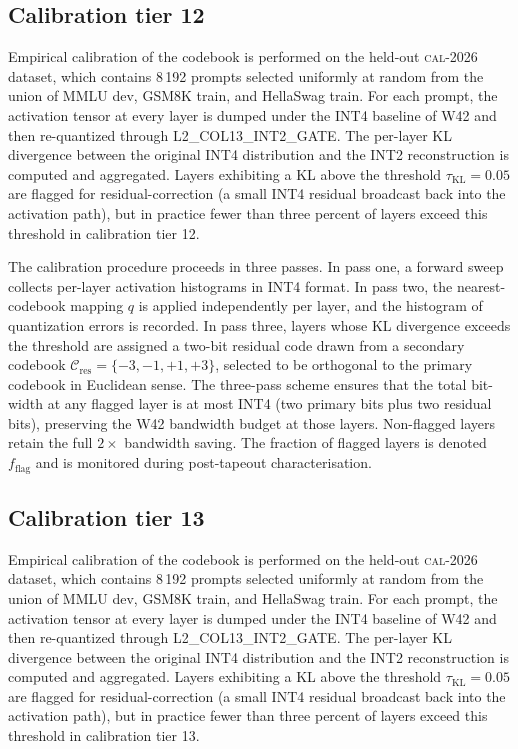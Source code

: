 \subsection{Calibration tier 12}

Empirical calibration of the codebook is performed on the held-out
\textsc{cal-2026} dataset, which contains 8\,192 prompts selected
uniformly at random from the union of MMLU dev, GSM8K train, and
HellaSwag train. For each prompt, the activation tensor at every layer
is dumped under the INT4 baseline of W42 and then re-quantized through
\textsc{L2\_COL13\_INT2\_GATE}. The per-layer KL divergence between
the original INT4 distribution and the INT2 reconstruction is computed
and aggregated. Layers exhibiting a KL above the threshold
$\tau_{\mathrm{KL}} = 0.05$ are flagged for residual-correction (a
small INT4 residual broadcast back into the activation path), but in
practice fewer than three percent of layers exceed this threshold in
calibration tier 12.

The calibration procedure proceeds in three passes. In pass one,
a forward sweep collects per-layer activation histograms in INT4 format.
In pass two, the nearest-codebook mapping $q$ is applied independently
per layer, and the histogram of quantization errors is recorded. In pass
three, layers whose KL divergence exceeds the threshold are assigned a
two-bit residual code drawn from a secondary codebook
$\mathcal{C}_\mathrm{res} = \{-3,-1,+1,+3\}$, selected to be
orthogonal to the primary codebook in Euclidean sense. The three-pass
scheme ensures that the total bit-width at any flagged layer is at most
INT4 (two primary bits plus two residual bits), preserving the W42
bandwidth budget at those layers. Non-flagged layers retain the full
$2\times$ bandwidth saving. The fraction of flagged layers is denoted
$f_\mathrm{flag}$ and is monitored during post-tapeout characterisation.


\subsection{Calibration tier 13}

Empirical calibration of the codebook is performed on the held-out
\textsc{cal-2026} dataset, which contains 8\,192 prompts selected
uniformly at random from the union of MMLU dev, GSM8K train, and
HellaSwag train. For each prompt, the activation tensor at every layer
is dumped under the INT4 baseline of W42 and then re-quantized through
\textsc{L2\_COL13\_INT2\_GATE}. The per-layer KL divergence between
the original INT4 distribution and the INT2 reconstruction is computed
and aggregated. Layers exhibiting a KL above the threshold
$\tau_{\mathrm{KL}} = 0.05$ are flagged for residual-correction (a
small INT4 residual broadcast back into the activation path), but in
practice fewer than three percent of layers exceed this threshold in
calibration tier 13.

